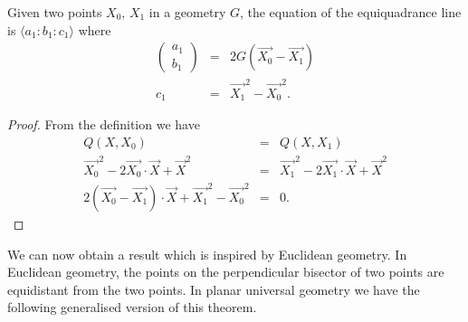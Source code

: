 \begin{theorem}
Given two points $X_0$, $X_1$ in a geometry $G$, the equation of the equiquadrance line is $\langle a_1\!:\!b_1\!:\!c_1\rangle$ where
\begin{eqnarray}
\begin{pmatrix} a_1 \\ b_1 \end{pmatrix} & = & 2G(\vec{X_0} - \vec{X_1})\\
c_1 & = & \vec{X_1}^2 - \vec{X_0}^2.
\end{eqnarray}
\end{theorem}
\begin{proof} From the definition we have
\begin{eqnarray*}
Q(X, X_0) & = & Q(X, X_1)\\
\vec{X_0}^2 - 2\vec{X_0}\cdot\vec{X} + \vec{X}^2 & = & \vec{X_1}^2 - 2\vec{X_1}\cdot\vec{X} + \vec{X}^2\\
2(\vec{X_0} - \vec{X_1})\cdot\vec{X} + \vec{X_1}^2 - \vec{X_0}^2 & = & 0.
\end{eqnarray*}
\end{proof}

We can now obtain a result which is inspired by Euclidean geometry.
In Euclidean geometry, the points on the perpendicular bisector of two points are equidistant from the two points.
In planar universal geometry we have the following generalised version of this theorem.

